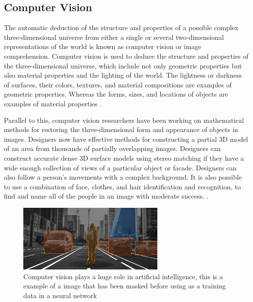 \subsection{Computer Vision}
The automatic deduction of the structure and properties of a possible complex three-dimensional universe from either a single or several two-dimensional representations of the world is known as computer vision or image comprehension. Computer vision is used to deduce the structure and properties of the three-dimensional universe, which include not only geometric properties but also material properties and the lighting of the world. The lightness or darkness of surfaces, their colors, textures, and material compositions are examples of geometric properties. Whereas the forms, sizes, and locations of objects are examples of material properties \cite{nalwa_what_1993}. %

Parallel to this, computer vision researchers have been working on mathematical methods for restoring the three-dimensional form and appearance of objects in images. Designers now have effective methods for constructing a partial 3D model of an area from thousands of partially overlapping images. Designers can construct accurate dense 3D surface models using stereo matching if they have a wide enough collection of views of a particular object or facade. Designers can also follow a person's movements with a complex background. It is also possible to use a combination of face, clothes, and hair identification and recognition, to find and name all of the people in an image with moderate success. \cite{szeliski_introduction_2010}.

\begin{figure}[ht]
    \centering
    \includegraphics[width=0.65\textwidth]{graphics/mask.png}
    \caption{Computer vision plays a huge role in artificial intelligence, this is a example of a image that has been masked before using as a training data in a neural network  \cite{ambalina_5_2020}}
    \label{fig:mask}
\end{figure}

